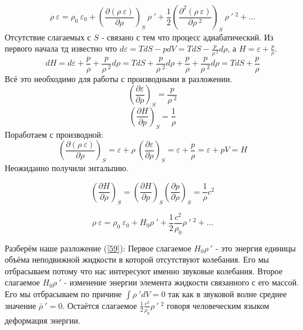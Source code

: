 \documentclass[14pt,a4paper,oneside]{extarticle}	%
\newcommand{\bracket}[1] {\left( #1 \right) } %
\newcommand{\dd}[1] {\partial #1 }
\newcommand{\dif}[2] {\bracket{ \frac{\partial #1}{\partial #2} }}
\begin{document}
\begin{equation*}
 \rho\:\varepsilon =  \rho_{0}\:\varepsilon_{0} + \bracket{\frac{\dd{ (\rho\:\varepsilon) }}{\dd{\rho}}}_{S} \: \rho\:' + \frac{1}{2}\bracket{\frac{\dd{^{2} (\rho\:\varepsilon) }}{\dd{\rho\:^{2}}}}_{S} \: \rho\:'\:^{2} + ...
\end{equation*}
Отсутствие слагаемых с $ S $ - связано с тем что процесс адиабатический.
Из первого начала тд известно что $ d\varepsilon = TdS - pdV = TdS - \frac{p}{\rho\:^{2}}d\rho$, а $ H = \varepsilon + \frac{p}{\rho}$.
\begin{equation*}
 dH = d\varepsilon + \frac{p}{\rho} + \frac{p}{\rho\:^{2}}d\rho = TdS + \frac{p}{\rho\:^{2}}d\rho + \frac{p}{\rho} + \frac{p}{\rho\:^{2}}d\rho =  TdS + \frac{p}{\rho} 
\end{equation*}
Всё это необходимо для работы с производными в разложении.
\begin{equation*}
\bracket{\frac{\dd{\varepsilon}}{\dd{\rho}}}_{S} = \frac{p}{\rho\:^{2}}
\end{equation*}
\begin{equation*}
\bracket{\frac{\dd{H}}{\dd{p}}}_{S} = \frac{1}{\rho}
\end{equation*}
Поработаем с производной:
\begin{equation*}
 \bracket{\frac{\dd{ (\rho\:\varepsilon) }}{\dd{\rho}}}_{S} = \varepsilon + \rho\:\bracket{\frac{\dd{\varepsilon}}{\dd{\rho}}}_{S} = \varepsilon +  \frac{p}{\rho} = \varepsilon + pV = H
\end{equation*}
Неожиданно получили энтальпию.

\begin{equation*}
\dif{H}{\rho}_{S} = \dif{H}{p}_{S}\dif{p}{\rho}_{S} = \frac{1}{\rho}c^{2}
\end{equation*}

\begin{equation}\label{59}
\rho\:\varepsilon = \rho_{0}\:\varepsilon_{0} + H_{0}\rho\:' + \frac{1}{2}\frac{c^{2}}{\rho_{0}}\rho\:'\:^{2} +...
\end{equation}

Разберём наше разложение (\ref{59}):
Первое слагаемое $ H_{0}\rho\:' $ - это энергия единицы объёма неподвижной жидкости в которой отсутствуют колебания. Его мы отбрасываем потому что нас интересуют именно звуковые колебания.
Второе слагаемое $ H_{0}\rho\:' $  - изменение энергии элемента жидкости связанного с его массой. Его мы отбрасываем по причине $ \int \rho\:' dV = 0 $ так как в звуковой волне среднее значение $ \bar{\rho}\:' = 0 $.
Остаётся слагаемое $ \frac{1}{2}\frac{c^{2}}{\rho_{0}}\rho\:'\:^{2} $ говоря человеческим языком деформация энергии.
\end{document}
